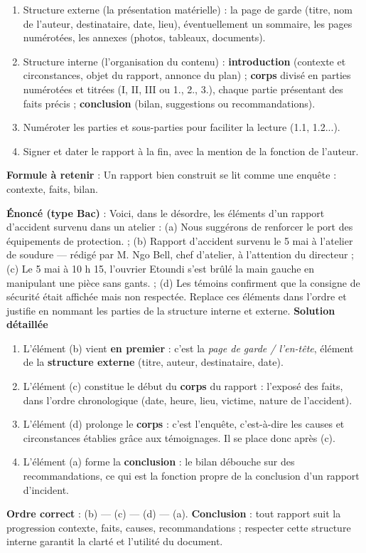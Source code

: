 \documentclass[11pt]{article}
\newcommand{\cle}[1]{{\popxbold\color{popdark}#1}}
\begin{document}
\begin{methode}
\begin{enumerate}
\item \cle{Structure externe} (la présentation matérielle) : la page de garde (titre, nom de l'auteur, destinataire, date, lieu), éventuellement un sommaire, les pages numérotées, les annexes (photos, tableaux, documents).
\item \cle{Structure interne} (l'organisation du contenu) : \textbf{introduction} (contexte et circonstances, objet du rapport, annonce du plan) ; \textbf{corps} divisé en parties numérotées et titrées (I, II, III ou 1., 2., 3.), chaque partie présentant des faits précis ; \textbf{conclusion} (bilan, suggestions ou recommandations).
\item \cle{Numéroter} les parties et sous-parties pour faciliter la lecture (1.1, 1.2...).
\item \cle{Signer et dater} le rapport à la fin, avec la mention de la fonction de l'auteur.
\end{enumerate}
\textbf{Formule à retenir} : \og Un rapport bien construit se lit comme une enquête : contexte, faits, bilan. \fg{}
\end{methode}

\begin{exoresolu}
\textbf{Énoncé (type Bac)} : Voici, dans le désordre, les éléments d'un rapport d'accident survenu dans un atelier : (a) \og Nous suggérons de renforcer le port des équipements de protection. \fg{} ; (b) \og Rapport d'accident survenu le 5 mai à l'atelier de soudure — rédigé par M. Ngo Bell, chef d'atelier, à l'attention du directeur \fg{} ; (c) \og Le 5 mai à 10 h 15, l'ouvrier Etoundi s'est brûlé la main gauche en manipulant une pièce sans gants. \fg{} ; (d) \og Les témoins confirment que la consigne de sécurité était affichée mais non respectée. \fg{} Replace ces éléments dans l'ordre et justifie en nommant les parties de la structure interne et externe.
\tcblower
\textbf{Solution détaillée}
\begin{enumerate}
\item L'élément (b) vient \textbf{en premier} : c'est la \emph{page de garde / l'en-tête}, élément de la \textbf{structure externe} (titre, auteur, destinataire, date).
\item L'élément (c) constitue le début du \textbf{corps} du rapport : l'exposé des faits, dans l'ordre chronologique (date, heure, lieu, victime, nature de l'accident).
\item L'élément (d) prolonge le \textbf{corps} : c'est l'enquête, c'est-à-dire les causes et circonstances établies grâce aux témoignages. Il se place donc après (c).
\item L'élément (a) forme la \textbf{conclusion} : le bilan débouche sur des recommandations, ce qui est la fonction propre de la conclusion d'un rapport d'incident.
\end{enumerate}
\textbf{Ordre correct} : (b) — (c) — (d) — (a).
\textbf{Conclusion} : tout rapport suit la progression contexte, faits, causes, recommandations ; respecter cette structure interne garantit la clarté et l'utilité du document.
\end{exoresolu}
\end{document}
